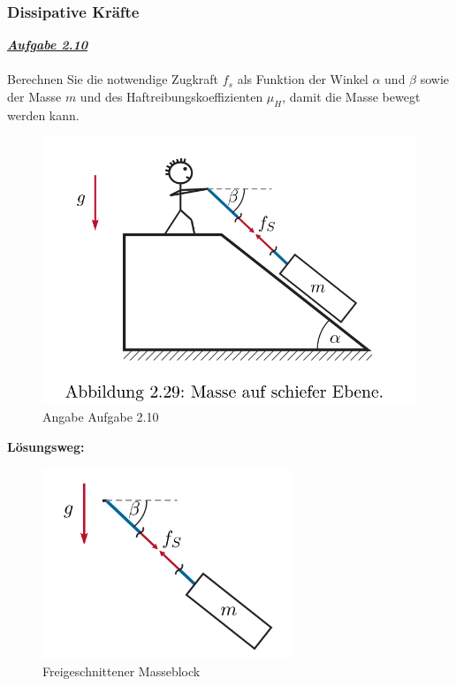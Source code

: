 \documentclass[a4paper,12p]{article}
\begin{document}
\subsubsection{Dissipative Kräfte }
\underline{\textbf{\textit{Aufgabe 2.10}}}\\ \\
Berechnen Sie die notwendige Zugkraft $f_{s}$ als Funktion der Winkel $\alpha$ und $\beta$ sowie der Masse $m$ und des Haftreibungskoeffizienten $\mu_{H}$, damit die Masse bewegt werden kann.
\begin{figure}[h]
	\begin{center}
		\includegraphics[width=12.5cm]{pic/Angabe2_10}
		\caption{Angabe Aufgabe 2.10}
		\label{Angabe 2.10}
	\end{center}
\end{figure}
\newpage
\begin{flushleft}
	\textbf{Lösungsweg:}
\end{flushleft}
\begin{figure}[h]
	\begin{center}
		\includegraphics[width=7.5cm]{pic/Angabe2_10_2}
		\caption{Freigeschnittener Masseblock}
		\label{Loesung2.10}
	\end{center}
\end{figure}
\end{document}
